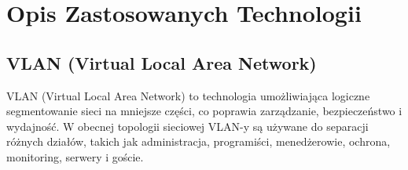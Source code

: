 \chapter{Opis Zastosowanych Technologii}

\section{VLAN (Virtual Local Area Network)}

VLAN (Virtual Local Area Network) to technologia umożliwiająca logiczne segmentowanie sieci na mniejsze części, co poprawia zarządzanie, bezpieczeństwo i wydajność. W obecnej topologii sieciowej VLAN-y są używane do separacji różnych działów, takich jak administracja, programiści, menedżerowie, ochrona, monitoring, serwery i goście.

